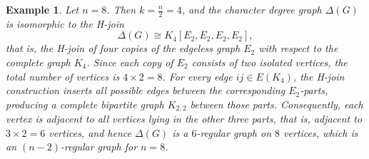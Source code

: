 \documentclass[11pt]{amsart}
\newtheorem{exam}[thm]{\bf Example}
\begin{document}
\begin{exam}\label{ex:n8-regular}
Let $n=8$. Then $k=\frac{n}{2}=4$, and the character degree graph $\Delta(G)$ is isomorphic to the H-join
\[
\Delta(G) \cong K_4[E_2, E_2, E_2, E_2],
\]
that is, the H-join of four copies of the edgeless graph $E_2$ with respect to the complete graph $K_4$. Since each copy of $E_2$ consists of two isolated vertices, the total number of vertices is $4 \times 2 = 8$. For every edge $ij \in E(K_4)$, the H-join construction inserts all possible edges between the corresponding $E_2$-parts, producing a complete bipartite graph $K_{2,2}$ between those parts. Consequently, each vertex is adjacent to all vertices lying in the other three parts, that is, adjacent to $3 \times 2 = 6$ vertices, and hence $\Delta(G)$ is a $6$-regular graph on $8$ vertices, which is an $(n-2)$-regular graph for $n = 8$.

\begin{center}
\end{center}
\end{exam}
\end{document}
